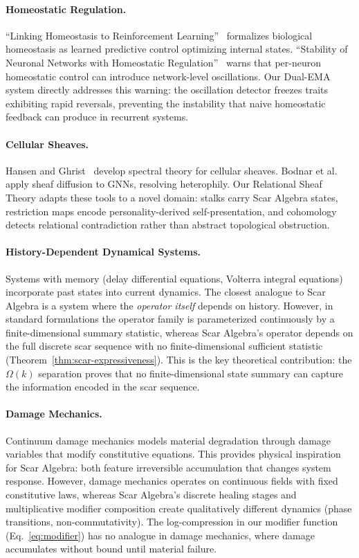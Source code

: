 \documentclass[11pt]{article}
\begin{document}
\paragraph{Homeostatic Regulation.}
``Linking Homeostasis to Reinforcement Learning''~\cite{homeostasis2025} formalizes biological homeostasis as learned predictive control optimizing internal states. ``Stability of Neuronal Networks with Homeostatic Regulation''~\cite{stability2015} warns that per-neuron homeostatic control can introduce network-level oscillations. Our Dual-EMA system directly addresses this warning: the oscillation detector freezes traits exhibiting rapid reversals, preventing the instability that naive homeostatic feedback can produce in recurrent systems.

\paragraph{Cellular Sheaves.}
Hansen and Ghrist~\cite{hansen2019} develop spectral theory for cellular sheaves. Bodnar et al.~\cite{bodnar2022} apply sheaf diffusion to GNNs, resolving heterophily. Our Relational Sheaf Theory adapts these tools to a novel domain: stalks carry Scar Algebra states, restriction maps encode personality-derived self-presentation, and cohomology detects relational contradiction rather than abstract topological obstruction.

\paragraph{History-Dependent Dynamical Systems.}
Systems with memory (delay differential equations, Volterra integral equations) incorporate past states into current dynamics. The closest analogue to Scar Algebra is a system where the \emph{operator itself} depends on history. However, in standard formulations the operator family is parameterized continuously by a finite-dimensional summary statistic, whereas Scar Algebra's operator depends on the full discrete scar sequence with no finite-dimensional sufficient statistic (Theorem~\ref{thm:scar-expressiveness}). This is the key theoretical contribution: the $\Omega(k)$ separation proves that no finite-dimensional state summary can capture the information encoded in the scar sequence.

\paragraph{Damage Mechanics.}
Continuum damage mechanics models material degradation through damage variables that modify constitutive equations. This provides physical inspiration for Scar Algebra: both feature irreversible accumulation that changes system response. However, damage mechanics operates on continuous fields with fixed constitutive laws, whereas Scar Algebra's discrete healing stages and multiplicative modifier composition create qualitatively different dynamics (phase transitions, non-commutativity). The log-compression in our modifier function (Eq.~\ref{eq:modifier}) has no analogue in damage mechanics, where damage accumulates without bound until material failure.
\end{document}
